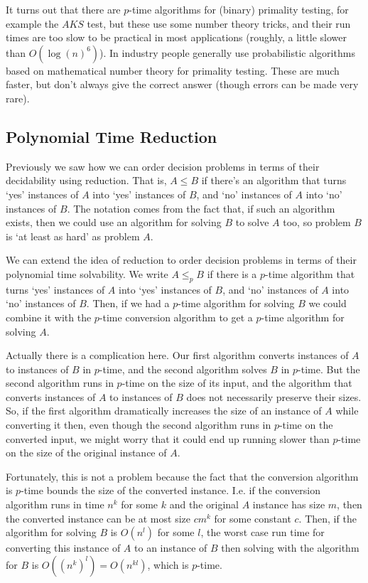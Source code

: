 \documentclass{article}
\theoremstyle{plain}
\theoremstyle{definition}
\begin{document}
It turns out that there are $p$-time algorithms for (binary) primality testing, for example the $AKS$ test, but these use some number theory tricks, and their run times are too slow to be practical in most applications (roughly, a little slower than $O(\log(n)^6)$). In industry people generally use probabilistic algorithms based on mathematical number theory for primality testing. These are much faster, but don't always give the correct answer (though errors can be made very rare).     


\subsection{Polynomial Time Reduction}
Previously we saw how we can order decision problems in terms of their decidability using reduction. That is, $A\leq B$ if there's an algorithm that turns `yes' instances of $A$ into `yes' instances of $B$, and `no' instances of $A$ into `no' instances of $B$. The notation comes from the fact that, if such an algorithm exists, then we could use an algorithm for solving $B$ to solve $A$ too, so problem $B$ is `at least as hard' as problem $A$.

We can extend the idea of reduction to order decision problems in terms of their polynomial time solvability. We write $A\leq_p B$ if there is a $p$-time algorithm that turns `yes' instances of $A$ into `yes' instances of $B$, and `no' instances of $A$ into `no' instances of $B$. Then, if we had a $p$-time algorithm for solving $B$ we could combine it with the $p$-time conversion algorithm to get a $p$-time algorithm for solving $A$.

Actually there is a complication here. Our first algorithm converts instances of $A$ to instances of $B$ in $p$-time, and the second algorithm solves $B$ in $p$-time. But the second algorithm runs in $p$-time on the size of its input, and the algorithm that converts instances of $A$ to instances of $B$ does not necessarily preserve their sizes. So, if the first algorithm dramatically increases the size of an instance of $A$ while converting it then, even though the second algorithm runs in $p$-time on the converted input, we might worry that it could end up running slower than $p$-time on the size of the original instance of $A$. 

Fortunately, this is not a problem because the fact that the conversion algorithm is $p$-time bounds the size of the converted instance. I.e. if the conversion algorithm runs in time $n^k$ for some $k$ and the original $A$ instance has size $m$, then the converted instance can be at most size $cm^k$ for some constant $c$. Then, if the algorithm for solving $B$ is $O(n^l)$ for some $l$, the worst case run time for converting this instance of $A$ to an instance of $B$ then solving with the algorithm for $B$ is $O((n^k)^l)=O(n^{kl})$, which is $p$-time.    
\end{document}
